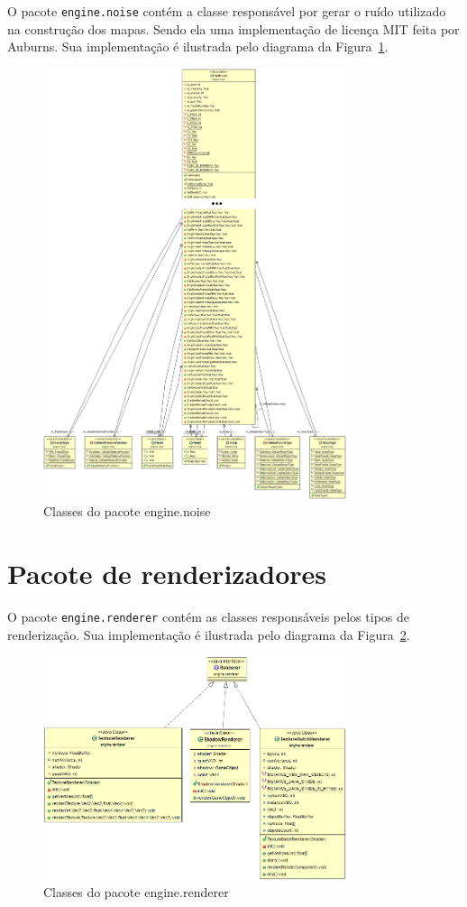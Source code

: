 \documentclass[12pt, 
openright, 
oneside, 
a4paper,    
brazil]{facom-ufu-abntex2}
\begin{document}
O pacote \texttt{engine.noise} contém a classe responsável por gerar o ruído utilizado na construção dos mapas. Sendo ela uma implementação de licença MIT feita por Auburns\cite{FastNoise}. Sua implementação é ilustrada pelo diagrama da Figura~\ref{fig:engine.noise}.

\begin{figure}[H]
	\centering
	\includegraphics[width=24em]{imagens/engine.noise.png}
	\caption{Classes do pacote engine.noise}
	\label{fig:engine.noise}
\end{figure}


\section{Pacote de renderizadores}

O pacote \texttt{engine.renderer} contém as classes responsáveis pelos tipos de renderização. Sua implementação é ilustrada pelo diagrama da Figura~\ref{fig:engine.renderer}.

\begin{figure}[H]
	\centering
	\includegraphics[width=24em]{imagens/engine.renderer.png}
	\caption{Classes do pacote engine.renderer}
	\label{fig:engine.renderer}
\end{figure}
\end{document}
